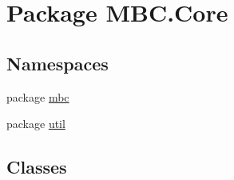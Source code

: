 \hypertarget{namespace_m_b_c_1_1_core}{\section{Package M\-B\-C.\-Core}
\label{namespace_m_b_c_1_1_core}
}
\subsection*{Namespaces}
\begin{DoxyCompactItemize}
\item 
package \hyperlink{namespace_m_b_c_1_1_core_1_1mbc}{mbc}
\item 
package \hyperlink{namespace_m_b_c_1_1_core_1_1util}{util}
\end{DoxyCompactItemize}
\subsection*{Classes}

